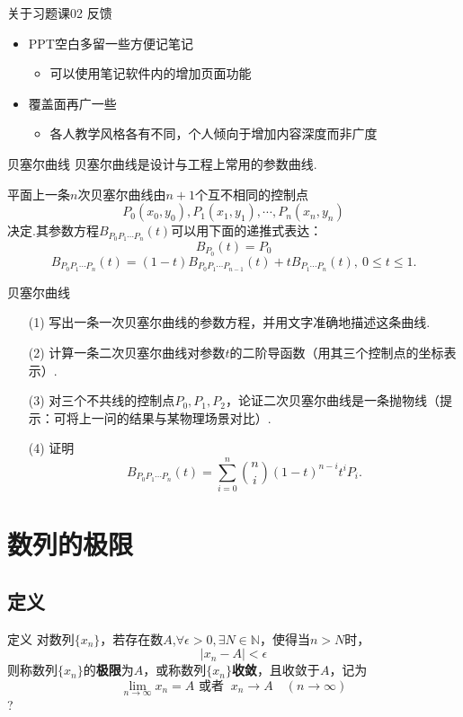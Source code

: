 \documentclass[]{beamer}
\begin{document}
\begin{frame}{关于习题课02 反馈}
    \begin{itemize}
        \item PPT空白多留一些方便记笔记
        \begin{itemize}
            \item 可以使用笔记软件内的增加页面功能
        \end{itemize}
        \item 覆盖面再广一些
        \begin{itemize}
            \item 各人教学风格各有不同，个人倾向于增加内容深度而非广度
        \end{itemize}
    \end{itemize}
\end{frame}

\begin{frame}{贝塞尔曲线}
    贝塞尔曲线是设计与工程上常用的参数曲线.

    平面上一条$n$次贝塞尔曲线由$n+1$个互不相同的控制点
    \[
    P_0(x_0,y_0), P_1(x_1,y_1), \cdots ,P_n(x_n,y_n)
    \]
    决定.其参数方程$B_{P_0P_1\cdots P_n}(t)$可以用下面的递推式表达：
    \[
    B_{P_0}(t)=P_0
    \]\[
    B_{P_0P_1\cdots P_n}(t)=(1-t)B_{P_0P_1\cdots P_{n-1}}(t)+tB_{P_1\cdots P_n}(t),\ 0\le t\le 1.
    \]
\end{frame}

\begin{frame}{贝塞尔曲线}
    \begin{enumerate}
        \item[(1)] 写出一条一次贝塞尔曲线的参数方程，并用文字准确地描述这条曲线.
        \item[(2)] 计算一条二次贝塞尔曲线对参数$t$的二阶导函数（用其三个控制点的坐标表示）.
        \item[(3)] 对三个不共线的控制点$P_0,P_1,P_2$，论证二次贝塞尔曲线是一条抛物线（提示：可将上一问的结果与某物理场景对比）.
        \item[(4)] 证明
        \[
        B_{P_0P_1\cdots P_n}(t)=\sum_{i=0}^{n}{n\choose i}(1-t)^{n-i} t^i P_i.
        \]
    \end{enumerate}
\end{frame}

\section{数列的极限}
\subsection{定义}
\begin{frame}{定义}
    对数列$\{x_n\}$，若存在数$A$,$\forall \epsilon>0,\exists N\in \mathbb{N}$，使得当$n>N$时，
    \[
    |x_n-A|<\epsilon
    \]
    则称数列$\{x_n\}$的\textbf{极限}为$A$，或称数列$\{x_n\}$\textbf{收敛}，且收敛于$A$，记为
    \[
    \lim_{n\rightarrow\infty}x_n=A \text{ 或者 }\ x_n\rightarrow A\quad (n\rightarrow\infty)
    \]
    \color{red}?
\end{frame}
\end{document}
